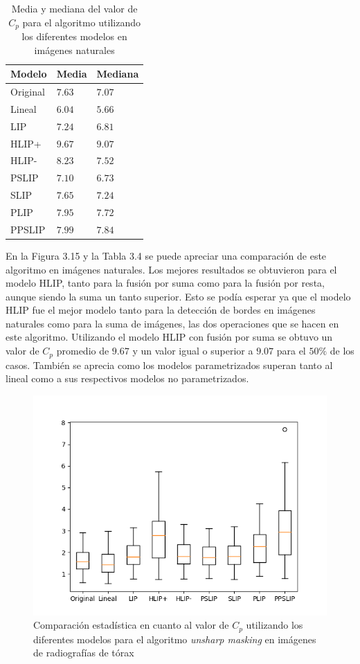 \begin{table}
	\begin{center}
		\begin{tabular}{|l|l|l|}
			\hline 
			Modelo & Media & Mediana\\
			\hline
			Original & $7.63$ & $7.07$\\
			\hline
			Lineal & $6.04$ & $5.66$\\
			\hline
			LIP & $7.24$ & $6.81$\\
			\hline
			HLIP+ & $9.67$ & $9.07$\\
			\hline
			HLIP- & $8.23$ & $7.52$\\
			\hline
			PSLIP & $7.10$ & $6.73$\\
			\hline
			SLIP & $7.65$ & $7.24$\\
			\hline
			PLIP & $7.95$ & $7.72$\\
			\hline
			PPSLIP & $7.99$ & $7.84$\\
			\hline
		\end{tabular}
		\caption{Media y mediana del valor de $C_p$ para el algoritmo  utilizando los diferentes modelos en im\'agenes naturales}
	\end{center}
\end{table}

En la Figura 3.15 y la Tabla 3.4 se puede apreciar una comparaci\'on de este algoritmo en im\'agenes naturales. Los mejores resultados se obtuvieron para el modelo HLIP, tanto para la fusi\'on por suma como para la fusi\'on por resta, aunque siendo la suma un tanto superior. Esto se pod\'ia esperar ya que el modelo HLIP fue el mejor modelo tanto para la detecci\'on de bordes en im\'agenes naturales como para la suma de im\'agenes, las dos operaciones que se hacen en este algoritmo. Utilizando el modelo HLIP con fusi\'on por suma se obtuvo un valor de $C_p$ promedio de $9.67$ y un valor igual o superior a $9.07$ para el $50\%$ de los casos. Tambi\'en se aprecia como los modelos parametrizados superan tanto al lineal como a sus respectivos modelos no parametrizados.

\begin{figure}
	\begin{center}
		\includegraphics[width=10.0 cm]{images/graphics/torax/unsharp_masking/um_all.png}
		\caption{Comparaci\'on estad\'istica en cuanto al valor de $C_p$ utilizando los diferentes modelos para el algoritmo \textit{unsharp masking} en im\'agenes de radiograf\'ias de t\'orax}
	\end{center}
\end{figure}

